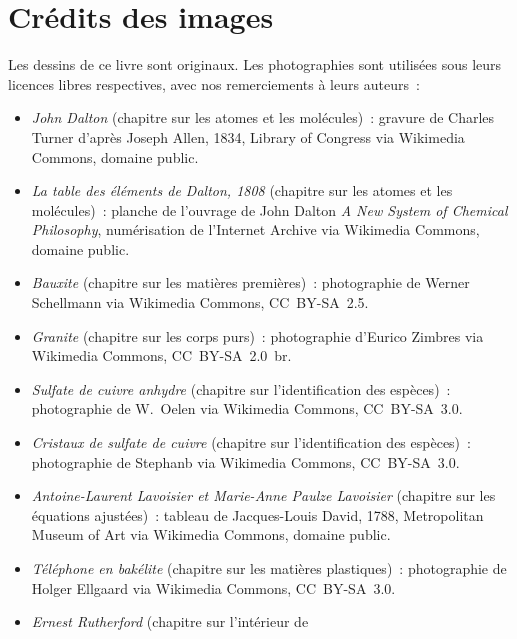 \chapter*{Crédits des images}

Les dessins de ce livre sont originaux. Les photographies sont
utilisées sous leurs licences libres respectives, avec nos
remerciements à leurs auteurs~:

\begin{itemize}
  \item \emph{John Dalton} (chapitre sur les atomes et les molécules)~:
        gravure de Charles Turner d'après Joseph Allen, 1834, Library of
        Congress via Wikimedia Commons, domaine public.
  \item \emph{La table des éléments de Dalton, 1808} (chapitre sur les
        atomes et les molécules)~: planche de l'ouvrage de John Dalton
        \emph{A New System of Chemical Philosophy}, numérisation de
        l'Internet Archive via Wikimedia Commons, domaine public.
  \item \emph{Bauxite} (chapitre sur les matières premières)~:
        photographie de Werner Schellmann via Wikimedia Commons,
        CC~BY-SA~2.5.
  \item \emph{Granite} (chapitre sur les corps purs)~: photographie
        d'Eurico Zimbres via Wikimedia Commons, CC~BY-SA~2.0~br.
  \item \emph{Sulfate de cuivre anhydre} (chapitre sur l'identification
        des espèces)~: photographie de W.~Oelen via Wikimedia Commons,
        CC~BY-SA~3.0.
  \item \emph{Cristaux de sulfate de cuivre} (chapitre sur
        l'identification des espèces)~: photographie de Stephanb via
        Wikimedia Commons, CC~BY-SA~3.0.
  \item \emph{Antoine-Laurent Lavoisier et Marie-Anne Paulze Lavoisier}
        (chapitre sur les équations ajustées)~: tableau de Jacques-Louis
        David, 1788, Metropolitan Museum of Art via Wikimedia Commons,
        domaine public.
  \item \emph{Téléphone en bakélite} (chapitre sur les matières
        plastiques)~: photographie de Holger Ellgaard via Wikimedia
        Commons, CC~BY-SA~3.0.
  \item \emph{Ernest Rutherford} (chapitre sur l'intérieur de

\end{itemize}
